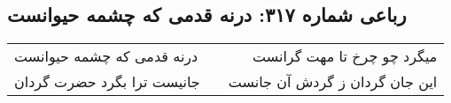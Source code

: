 \begin{center}
\section*{رباعی شماره ۳۱۷: درنه قدمی که چشمه حیوانست}
\label{sec:0317}
\begin{longtable}{l p{0.5cm} r}
درنه قدمی که چشمه حیوانست
&&
میگرد چو چرخ تا مهت گرانست
\\
جانیست ترا بگرد حضرت گردان
&&
این جان گردان ز گردش آن جانست
\\
\end{longtable}
\end{center}

